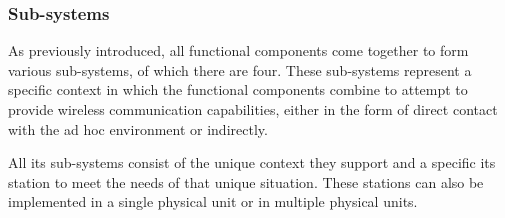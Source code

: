 \subsubsection{Sub-systems}

As previously introduced, all functional components come together to form various sub-systems, of which there are four. These sub-systems represent a specific context in which the functional components combine to attempt to provide wireless communication capabilities, either in the form of direct contact with the ad hoc environment or indirectly.

All \gls{its} sub-systems consist of the unique context they support and a specific \gls{its} station to meet the needs of that unique situation. These stations can also be implemented in a single physical unit or in multiple physical units.


